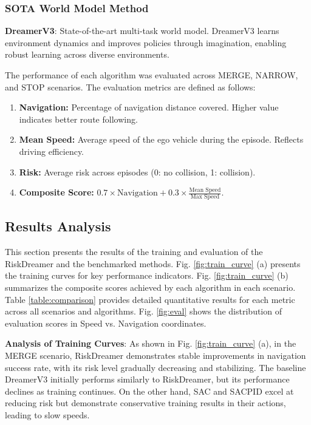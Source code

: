 \subsubsection{SOTA World Model Method}
    \textbf{DreamerV3}\cite{dreamerv3}:  State-of-the-art multi-task world model. DreamerV3 learns environment dynamics and improves policies through imagination, enabling robust learning across diverse environments.


The performance of each algorithm was evaluated across MERGE, NARROW, and STOP scenarios. The evaluation metrics are defined as follows:

    \begin{enumerate}
        \item \textbf{Navigation:} Percentage of navigation distance covered. Higher value indicates better route following.
        \item \textbf{Mean Speed:} Average speed of the ego vehicle during the episode. Reflects driving efficiency.
        \item \textbf{Risk:} Average risk across episodes (0: no collision, 1: collision). 
        \item \textbf{Composite Score:}  $0.7 \times \text{Navigation} + 0.3 \times \frac{\text{Mean Speed}}{\text{Max Speed}}$.  
    \end{enumerate}    

\subsection{Results Analysis}

This section presents the results of the training and evaluation of the RiskDreamer and the benchmarked methods.
Fig. \ref{fig:train_curve} (a) presents the training curves for key performance indicators. Fig. \ref{fig:train_curve} (b) summarizes the composite scores achieved by each algorithm in each scenario. Table \ref{table:comparison} provides detailed quantitative results for each metric across all scenarios and algorithms. Fig. \ref{fig:eval} shows the distribution of evaluation scores in Speed vs. Navigation coordinates.



\textbf{Analysis of Training Curves}: As shown in Fig. \ref{fig:train_curve} (a), in the MERGE scenario, RiskDreamer demonstrates stable improvements in navigation success rate, with its risk level gradually decreasing and stabilizing. The baseline DreamerV3 initially performs similarly to RiskDreamer, but its performance declines as training continues. On the other hand, SAC and SACPID excel at reducing risk but demonstrate conservative training results in their actions, leading to slow speeds.

